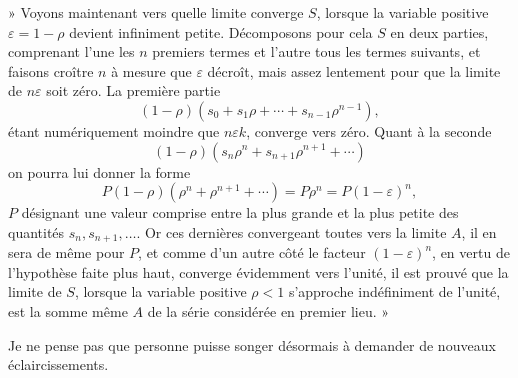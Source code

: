 \documentclass[11pt]{article}
\begin{document}
» Voyons maintenant vers quelle limite converge \(S\), lorsque la variable positive \(\varepsilon=1-\rho\) devient infiniment petite. Décomposons pour cela \(S\) en deux parties, comprenant l'une les \(n\) premiers termes et l'autre tous les termes suivants, et faisons croître \(n\) à mesure que \(\varepsilon\) décroît, mais assez lentement pour que la limite de \(n\varepsilon\) soit zéro. La première partie
\[
(1-\rho)(s_0+s_1\rho+\cdots+s_{n-1}\rho^{n-1}),
\]
étant numériquement moindre que \(n\varepsilon k\), converge vers zéro. Quant à la seconde
\[
(1-\rho)(s_n\rho^n+s_{n+1}\rho^{n+1}+\cdots)
\]
on pourra lui donner la forme
\[
P(1-\rho)(\rho^n+\rho^{n+1}+\cdots)=P\rho^n=P(1-\varepsilon)^n,
\]
\(P\) désignant une valeur comprise entre la plus grande et la plus petite des quantités \(s_n, s_{n+1},\ldots\). Or ces dernières convergeant toutes vers la limite \(A\), il en sera de même pour \(P\), et comme d'un autre côté le facteur \((1-\varepsilon)^n\), en vertu de l'hypothèse faite plus haut, converge évidemment vers l'unité, il est prouvé que la limite de \(S\), lorsque la variable positive \(\rho<1\) s'approche indéfiniment de l'unité, est la somme même \(A\) de la série considérée en premier lieu. »

Je ne pense pas que personne puisse songer désormais à demander de nouveaux éclaircissements.
\end{document}
